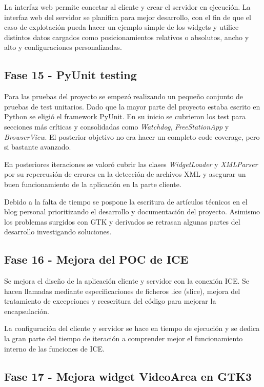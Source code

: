 La interfaz web permite conectar al cliente y crear el servidor en ejecución. La
interfaz web del servidor se planifica para mejor desarrollo, con el fin de 
que el caso de explotación pueda hacer un ejemplo simple de los
widgets y utilice distintos datos cargados como posicionamientos
relativos o absolutos, ancho y alto y configuraciones personalizadas.

\subsection{Fase 15 - PyUnit testing}

Para las pruebas del proyecto se empezó realizando un pequeño conjunto de
pruebas de test unitarios. Dado que la mayor parte del proyecto estaba escrito
en Python se eligió el framework PyUnit. En su inicio se cubrieron los test para
secciones más críticas y consolidadas como \emph{Watchdog}, 
\emph{FreeStationApp} y \emph{BrowserView}. El posterior objetivo no era hacer
un completo code coverage, pero si bastante avanzado.

En posteriores iteraciones se valoró cubrir las clases \emph{WidgetLoader} y
\emph{XMLParser} por su repercusión de errores en la detección de archivos XML y
asegurar un buen funcionamiento de la aplicación en la parte cliente.

Debido a la falta de tiempo se pospone la escritura de artículos técnicos en el
blog personal prioritizando el desarrollo y documentación del proyecto. Asimismo
los problemas surgidos con GTK y derivados se retrasan algunas partes del 
desarrollo investigando soluciones.

\subsection{Fase 16 - Mejora del POC de ICE}

Se mejora el diseño de la aplicación cliente y servidor con la conexión ICE. Se
hacen llamadas mediante especificaciones de ficheros .ice (slice), mejora del 
tratamiento de excepciones y reescritura del código para mejorar la
encapsulación.

La configuración del cliente y servidor se hace en tiempo de ejecución y se
dedica la gran parte del tiempo de iteración a comprender mejor el
funcionamiento interno de las funciones de ICE.

\newpage

\subsection{Fase 17 - Mejora widget VideoArea en GTK3}

